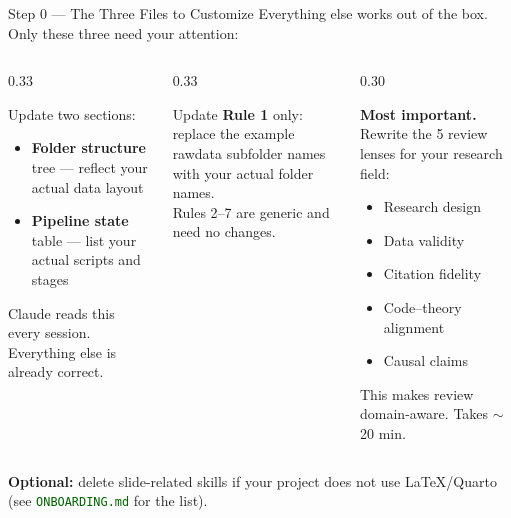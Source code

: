 \documentclass[aspectratio=169,11pt,dvipsnames]{beamer}
\newcommand{\file}[1]{\textcolor{darkgreen}{\nolinkurl{#1}}}
\begin{document}
\begin{frame}{Step 0 — The Three Files to Customize}
\scriptsize
  Everything else works out of the box. Only these three need your attention:
  \vspace{0.2cm}
  \begin{columns}[T]
    \begin{column}{0.33\textwidth}
      \begin{greenbox}[title=1. CLAUDE.md]
        Update two sections:
        \begin{itemize}
          \item \textbf{Folder structure} tree --- reflect your actual data layout
          \item \textbf{Pipeline state} table --- list your actual scripts and stages
        \end{itemize}
        \vspace{0.2cm}
        Claude reads this every session.
        Everything else is already correct.
      \end{greenbox}
    \end{column}
    \begin{column}{0.33\textwidth}
      \begin{greenbox}[title=2. project-rules.md]
        Update \textbf{Rule 1} only:\\
        replace the example rawdata subfolder names with
        your actual folder names.\\[0.3cm]
        Rules 2--7 are generic and need no changes.
      \end{greenbox}
    \end{column}
    \begin{column}{0.30\textwidth}
      \begin{alertbox}[title=\faExclamationTriangle\ 3. domain-reviewer.md]
        \small \textbf{Most important.} Rewrite the 5 review lenses
        for your research field:
        \begin{itemize}
          \item Research design
          \item Data validity
          \item Citation fidelity
          \item Code--theory alignment
          \item Causal claims
        \end{itemize}
        This makes review domain-aware.
        Takes $\sim$20 min.
      \end{alertbox}
    \end{column}
  \end{columns}
  \vspace{0.2cm}
  \begin{center}
    \small \textbf{Optional:} delete slide-related skills if your project
    does not use LaTeX/Quarto (see \file{ONBOARDING.md} for the list).
  \end{center}
\end{frame}
\end{document}
